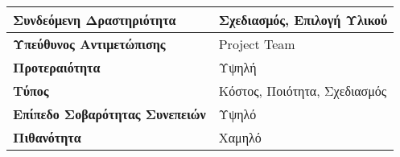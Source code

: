 \documentclass{article}
\newcommand\T{\rule{0pt}{2.6ex}}       %
\newcommand\B{\rule[-1.2ex]{0pt}{0pt}}
\begin{document}
 \begin{center}
     \begin{tabular}{|l|l|}
     \hline
      \textbf{Συνδεόμενη Δραστηριότητα}   & Σχεδιασμός, Επιλογή Υλικού \T\B \\ 
      \hline
      \textbf{Υπεύθυνος Αντιμετώπισης} & Project Team \T\B \\
      \hline
      \textbf{Προτεραιότητα} & Υψηλή \T\B \\
      \hline
      \textbf{Τύπος} & Κόστος, Ποιότητα, Σχεδιασμός \T\B \\
      \hline
      \textbf{Επίπεδο Σοβαρότητας Συνεπειών} & Υψηλό \T\B \\
      \hline
      \textbf{Πιθανότητα} & Χαμηλό \T\B \\
      \hline
     \end{tabular}
 \end{center}
\end{document}
